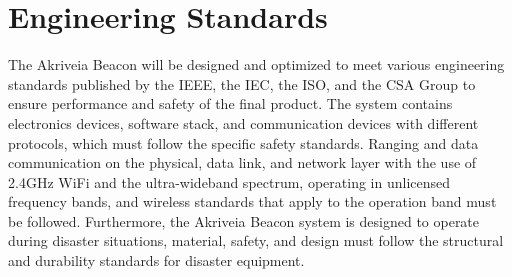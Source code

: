 
\setcounter{section}{2}
\section{Engineering Standards}
\bigskip

The Akriveia Beacon will be designed and optimized to meet various engineering standards published by the IEEE, the IEC, the ISO, and the CSA Group to ensure performance and safety of the final product. The system contains electronics devices, software stack, and communication devices with different protocols, which must follow the specific safety standards. Ranging and data communication on the physical, data link, and network layer with the use of 2.4GHz WiFi and the ultra-wideband spectrum, operating in unlicensed frequency bands, and wireless standards that apply to the operation band must be followed. Furthermore, the Akriveia Beacon system is designed to operate during disaster situations, material, safety, and design must follow the structural and durability standards for disaster equipment. 

